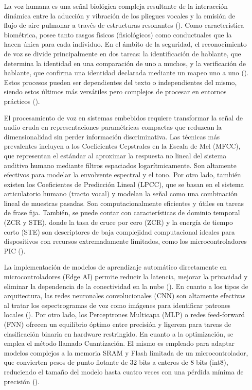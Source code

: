 La voz humana es una señal biológica compleja resultante de la interacción dinámica entre
la aducción y vibración de los pliegues vocales y la emisión de flujo de aire pulmonar a través
de estructuras resonantes (\cite{lee2021}). Como característica biométrica, posee tanto rasgos
físicos (fisiológicos) como conductuales que la hacen única para cada individuo. En el ámbito
de la seguridad, el reconocimiento de voz se divide principalmente en dos tareas: la
identificación de hablante, que determina la identidad en una comparación de uno a muchos, y
la verificación de hablante, que confirma una identidad declarada mediante un mapeo uno a
uno (\cite{shivani}). Estos procesos pueden ser dependientes del texto o
independientes del mismo, siendo estos últimos más versátiles pero complejos de procesar en
entornos prácticos (\cite{costantini}).

El procesamiento de voz en sistemas embebidos requiere transformar la señal de audio
cruda en representaciones paramétricas compactas que reduzcan la dimensionalidad sin perder
información discriminativa. Las técnicas más prevalentes incluyen a los Coeficientes
Cepstrales en la Escala de Mel (MFCC), que representan el estándar al aproximar la respuesta
no lineal del sistema auditivo humano mediante filtros espaciados logarítmicamente. Son
altamente efectivos para modelar la envolvente espectral y el tono. Por otro lado, también
existen los Coeficientes de Predicción Lineal (LPCC), que se basan en el sistema articulatorio
humano (tracto vocal) y modelan la señal como una combinación lineal de muestras pasadas.
Son computacionalmente eficientes y útiles en tareas de frase fija. También, se puede contar
con características de dominio temporal (ZCR y STE), donde la tasa de cruce por cero (ZCR)
y la energía de tiempo corto (STE) son descriptores de baja complejidad computacional
ideales para dispositivos con recursos extremadamente limitados, como los
microcontroladores PIC (\cite{shili}).

La implementación de modelos de aprendizaje automático directamente en
microcontroladores (Edge AI) permite reducir la latencia, mejorar la privacidad y eliminar la
dependencia de la conectividad en la nube (\cite{roharia}). En cuanto a los tipos de arquitectura, las
redes neuronales convolucionales (CNN) son altamente efectivas al tratar los espectrogramas
de voz como imágenes para identificar patrones locales (\cite{costantini}). Por otro lado, los 
Perceptrones Multicapa (MLP) o redes feed-forward (FNN) ofrecen
un equilibrio óptimo entre precisión y ligereza para tareas de clasificación binaria en hardware
restringido. En cuanto a la optimización, se emplea el método llamado Cuantización. El
mismo es empleado para adaptar modelos complejos a la memoria SRAM y Flash limitada de
un microcontrolador, que convierten pesos de punto flotante de 32 bits a enteros de 8 bits
(int8), reduciendo el tamaño del modelo hasta cuatro veces con una pérdida mínima de
precisión (\cite{evans}).

